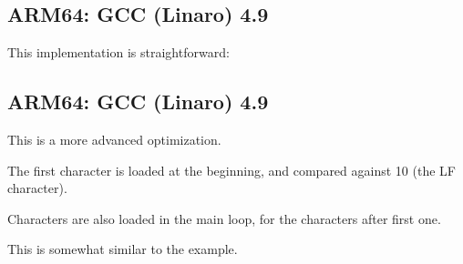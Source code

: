 ﻿\subsection{ARM64: \NonOptimizing GCC (Linaro) 4.9}

This implementation is straightforward:



\subsection{ARM64: \Optimizing GCC (Linaro) 4.9}

This is a more advanced optimization.

The first character is loaded at the beginning, and compared against 10 (the \ac{LF} character).

Characters are also loaded in the main loop, for the characters after first one.

This is somewhat similar to the  example.



